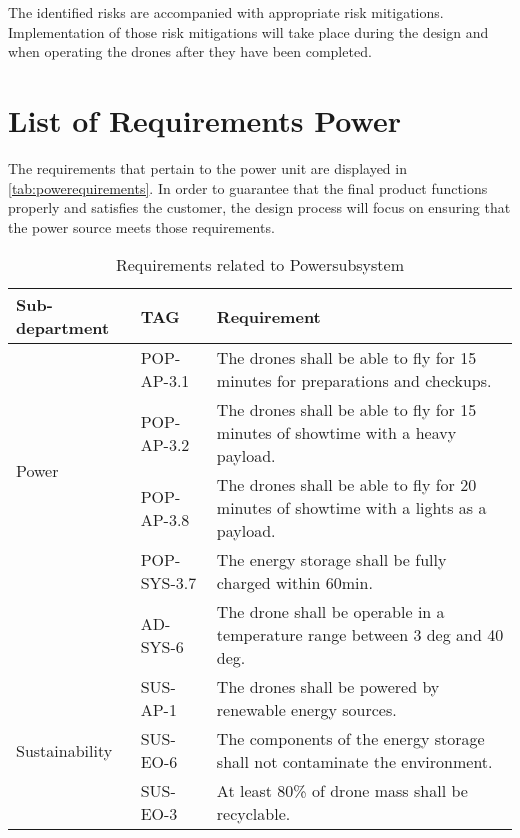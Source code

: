 The identified risks are accompanied with appropriate risk mitigations. Implementation of those risk mitigations will take place during the design and when operating the drones after they have been completed.


\section{List of Requirements Power}
\label{sec:powerlistofrequirements}

The requirements that pertain to the power unit are displayed in \autoref{tab:powerequirements}. In order to guarantee that the final product functions properly and satisfies the customer, the design process will focus on ensuring that the power source meets those requirements.


\begin{table}[H]
\centering
\caption{Requirements related to Powersubsystem}
\label{tab:powerequirements}
\begin{tabular}{|p{2.7cm}|p{2cm}|p{10cm}|}
\hline
\textbf{Sub-department} & \textbf{TAG} & \textbf{Requirement} \\ \hline
\multirow{4}{*}{Power}                                                   
                          & POP-AP-3.1    & The drones shall be able to fly for 15 minutes for preparations and checkups.    \\ \cline{2-3}                                               
                          & POP-AP-3.2    & The drones shall be able to fly for 15 minutes of showtime with a heavy payload.  \\ \cline{2-3}  
                          & POP-AP-3.8    & The drones shall be able to fly for 20 minutes of showtime with a lights as a payload.  \\ \cline{2-3}     
                          & POP-SYS-3.7   & The energy storage shall be fully charged within 60min. \\ \cline{2-3} 
                          & AD-SYS-6      & The drone shall be operable in a temperature range between 3 deg and 40 deg.  \\ \hline 
\multirow{3}{*}{Sustainability}      & SUS-AP-1      & The drones shall be powered by renewable energy sources.                                                                       \\\cline{2-3} 
                          & SUS-EO-6      & The components of the energy storage shall not contaminate the environment.                                                         \\\cline{2-3}
                          & SUS-EO-3      & At least 80\% of drone mass shall be recyclable.       \\ \hline
                          

\end{tabular}
\end{table}
